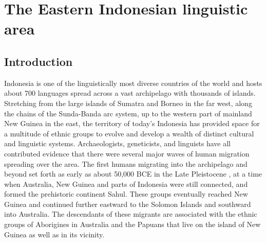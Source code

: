 \chapter{The Eastern Indonesian linguistic area}\label{ch:area}

\section{Introduction} \label{sec:area_intro}
Indonesia is one of the linguistically most diverse countries of the world and hosts about 700 languages spread across a vast archipelago with thousands of islands. Stretching from the large islands of Sumatra and Borneo in the far west, along the chains of the Sunda-Banda arc system, up to the western part of mainland New Guinea in the east, the territory of today's Indonesia has provided space for a multitude of ethnic groups to evolve and develop a wealth of distinct cultural and linguistic systems. Archaeologists, geneticists, and linguists have all contributed evidence that there were several major waves of human migration spreading over the area. The first humans migrating into the archipelago and beyond set forth as early as about 50,000 BCE in the Late Pleistocene \citep{capelli2001}, at a time when Australia, New Guinea and parts of Indonesia were still connected, and formed the prehistoric continent Sahul. These groups eventually reached New Guinea and continued further eastward to the Solomon Islands and southward into Australia. The descendants of these migrants are associated with the ethnic groups of Aborigines in Australia and the Papuans that live on the island of New Guinea as well as in its vicinity. 


